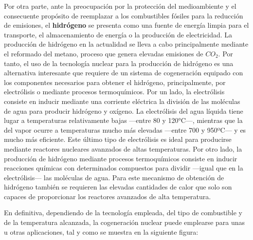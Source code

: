 Por otra parte, ante la preocupación por la protección del medioambiente y el consecuente propósito de reemplazar a los combustibles fósiles para la reducción de emisiones, el \textbf{hidrógeno} se presenta como una fuente de energía limpia para el transporte, el almacenamiento de energía o la producción de electricidad. La producción de hidrógeno en la actualidad se lleva a cabo principalmente mediante el reformado del metano, proceso que genera elevadas emisiones de $CO_2$. Por tanto, el uso de la tecnología nuclear para la producción de hidrógeno es una alternativa interesante que requiere de un sistema de cogeneración equipado con los componentes necesarios para obtener el hidrógeno, principalmente, por electrólisis o mediante procesos termoquímicos. Por un lado, la electrólisis consiste en inducir mediante una corriente eléctrica la división de las moléculas de agua para producir hidrógeno y oxígeno. La electrólisis del agua líquida tiene lugar a temperaturas relativamente bajas ---entre 80 y 120°C---, mientras que la del vapor ocurre a temperaturas mucho más elevadas ---entre 700 y 950ºC--- y es mucho más eficiente. Este último tipo de electrólisis es ideal para producirse mediante reactores nucleares avanzados de altas temperaturas. Por otro lado, la producción de hidrógeno mediante procesos termoquímicos consiste en inducir reacciones químicas con determinados compuestos para dividir ---igual que en la electrólisis--- las moléculas de agua. Para este mecanismo de obtención de hidrógeno también se requieren las elevadas cantidades de calor que solo son capaces de proporcionar los reactores avanzados de alta temperatura.

En definitiva, dependiendo de la tecnología empleada, del tipo de combustible y de la temperatura alcanzada, la cogeneración nuclear puede emplearse para unas u otras aplicaciones, tal y como se muestra en la siguiente figura:

